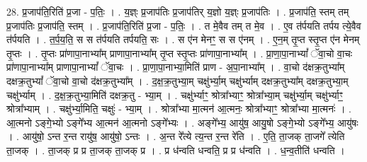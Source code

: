 \documentclass[17pt]{extarticle}
\begin{document}
28. प्र॒जाप॑ति॒रिति॑ प्र॒जा - प॒तिः॒ । . य॒ज्ञ्ः प्र॒जाप॑तिः प्र॒जाप॑तिर् य॒ज्ञो य॒ज्ञ्ः प्र॒जाप॑तिः । . प्र॒जाप॑ति॒ स्तम् तम् प्र॒जाप॑तिः प्र॒जाप॑ति॒ स्तम् । . प्र॒जाप॑ति॒रिति॑ प्र॒जा - प॒तिः॒ । . त मे॒वैव तम् त मे॒व । . ए॒व त॑र्पयति तर्पय त्ये॒वैव त॑र्पयति । . त॒र्प॒य॒ति॒ स स त॑र्पयति तर्पयति॒ सः । . स ए॑न मेनꣳ॒॒ स स ए॑नम् । . ए॒न॒म् तृ॒प्त स्तृ॒प्त ए॑न मेनम् तृ॒प्तः । . तृ॒प्तः प्रा॑णापा॒नाभ्या᳚म् प्राणापा॒नाभ्या᳚म् तृ॒प्त स्तृ॒प्तः प्रा॑णापा॒नाभ्या᳚म् । . प्रा॒णा॒पा॒नाभ्यां᳚ ॅवा॒चो वा॒चः प्रा॑णापा॒नाभ्या᳚म् प्राणापा॒नाभ्यां᳚ ॅवा॒चः । . प्रा॒णा॒पा॒नाभ्या॒मिति॑ प्राण - अ॒पा॒नाभ्या᳚म् । . वा॒चो द॑क्षक्र॒तुभ्या᳚म् दक्षक्र॒तुभ्यां᳚ ॅवा॒चो वा॒चो द॑क्षक्र॒तुभ्या᳚म् । . द॒क्ष॒क्र॒तुभ्या॒म् चक्षु॑र्भ्या॒म् चक्षु॑र्भ्याम् दक्षक्र॒तुभ्या᳚म् दक्षक्र॒तुभ्या॒म् चक्षु॑र्भ्याम् । . द॒क्ष॒क्र॒तुभ्या॒मिति॑ दक्षक्र॒तु - भ्या॒म् । . चक्षु॑र्भ्याꣳ॒॒ श्रोत्रा᳚भ्याꣳ॒॒ श्रोत्रा᳚भ्या॒म् चक्षु॑र्भ्या॒म् चक्षु॑र्भ्याꣳ॒॒ श्रोत्रा᳚भ्याम् । . चक्षु॑र्भ्या॒मिति॒ चक्षुः॑ - भ्या॒म् । . श्रोत्रा᳚भ्या मा॒त्मन॑ आ॒त्मनः॒ श्रोत्रा᳚भ्याꣳ॒॒ श्रोत्रा᳚भ्या मा॒त्मनः॑ । . आ॒त्मनो ऽङ्गे॒भ्यो ऽङ्गे᳚भ्य आ॒त्मन॑ आ॒त्मनो ऽङ्गे᳚भ्यः । . अङ्गे᳚भ्य॒ आयु॑ष॒ आयु॒षो ऽङ्गे॒भ्यो ऽङ्गे᳚भ्य॒ आयु॑षः । . आयु॑षो॒ ऽन्त र॒न्त रायु॑ष॒ आयु॑षो॒ ऽन्तः । . अ॒न्त रे᳚त्ये त्य॒न्त र॒न्त रे॑ति । . ए॒ति॒ ता॒जक् ता॒जगे᳚ त्येति ता॒जक् । . ता॒जक् प्र प्र ता॒जक् ता॒जक् प्र । . प्र ध॑न्वति धन्वति॒ प्र प्र ध॑न्वति । . ध॒न्व॒तीति॑ धन्वति । \newline
\end{document}
